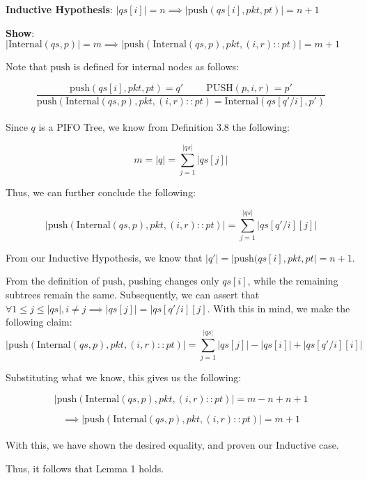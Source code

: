 \documentclass{article}
\begin{document}
\noindent \textbf{Inductive Hypothesis}: $|qs[i]| = n \implies |\text{push}(qs[i], pkt, pt)| = n+1$\newline

\noindent \textbf{Show}: $|\text{Internal}(qs, p)| = m \implies |\text{push}(\text{Internal}(qs, p), pkt, (i, r) :: pt)| = m+1$\newline

\noindent Note that $\text{push}$ is defined for internal nodes as follows:

$$\frac{\text{push}(qs[i], pkt, pt) = q' \hspace{1cm} \text{PUSH}(p, i, r) = p'}{\text{push}(\text{Internal}(qs, p), pkt, (i, r) :: pt) = \text{Internal}(qs[q'/i], p')}$$\\[-10pt]

\noindent Since $q$ is a PIFO Tree, we know from Definition 3.8 the following:

$$m = |q| = \sum_{j=1}^{|qs|} |qs[j]|$$

\noindent Thus, we can further conclude the following:

$$|\text{push}(\text{Internal}(qs, p), pkt, (i, r) :: pt)| = \sum_{j=1}^{|qs|} |qs[q'/i][j]|$$

\noindent From our Inductive Hypothesis, we know that $|q'| = |\text{push}(qs[i], pkt, pt| = n+1$.\newline

\noindent From the definition of $\text{push}$, pushing changes only $qs[i]$, while the remaining subtrees remain the same. Subsequently, we can assert that $\forall 
1 \leq j \leq |qs|, i \neq j \implies |qs[j]| = |qs[q'/i][j]$. With this in mind, we make the following claim:\\[-15pt]

$$|\text{push}(\text{Internal}(qs, p), pkt, (i, r) :: pt)| = \sum_{j=1}^{|qs|} |qs[j]| - |qs[i]| + |qs[q'/i][i]|$$

\noindent Substituting what we know, this gives us the following:

$$|\text{push}(\text{Internal}(qs, p), pkt, (i, r) :: pt)| = m - n + n + 1$$

$$\implies |\text{push}(\text{Internal}(qs, p), pkt, (i, r) :: pt)| = m + 1$$\\[-15pt]

\noindent With this, we have shown the desired equality, and proven our Inductive case.\newline

\noindent Thus, it follows that Lemma 1 holds.\newline
\end{document}
